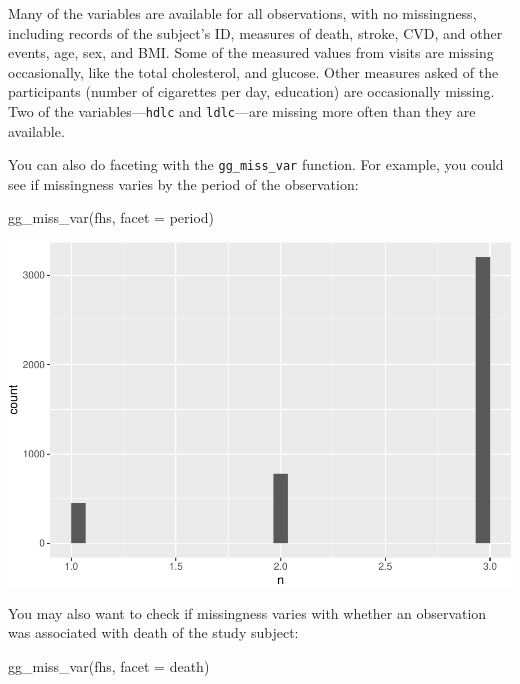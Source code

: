 \documentclass[
]{book}
\newenvironment{Shaded}{\begin{snugshade}}{\end{snugshade}}
\newcommand{\AttributeTok}[1]{\textcolor[rgb]{0.77,0.63,0.00}{#1}}
\newcommand{\FunctionTok}[1]{\textcolor[rgb]{0.00,0.00,0.00}{#1}}
\newcommand{\NormalTok}[1]{#1}
\begin{document}
Many of the variables are available for all observations, with no missingness,
including records of the subject's ID, measures of death, stroke, CVD, and other
events, age, sex, and BMI. Some of the measured values from visits are missing
occasionally, like the total cholesterol, and glucose. Other measures asked of
the participants (number of cigarettes per day, education) are occasionally
missing. Two of the variables---\texttt{hdlc} and \texttt{ldlc}---are missing more often than
they are available.

You can also do faceting with the \texttt{gg\_miss\_var} function. For
example, you could see if missingness varies by the period of the observation:

\begin{Shaded}
\begin{Highlighting}[]
\FunctionTok{gg\_miss\_var}\NormalTok{(fhs, }\AttributeTok{facet =}\NormalTok{ period)}
\end{Highlighting}
\end{Shaded}

\includegraphics{adv_epi_analysis_files/figure-latex/unnamed-chunk-121-1.pdf}

You may also want to check if missingness varies with whether an observation
was associated with death of the study subject:

\begin{Shaded}
\begin{Highlighting}[]
\FunctionTok{gg\_miss\_var}\NormalTok{(fhs, }\AttributeTok{facet =}\NormalTok{ death)}
\end{Highlighting}
\end{Shaded}
\end{document}
